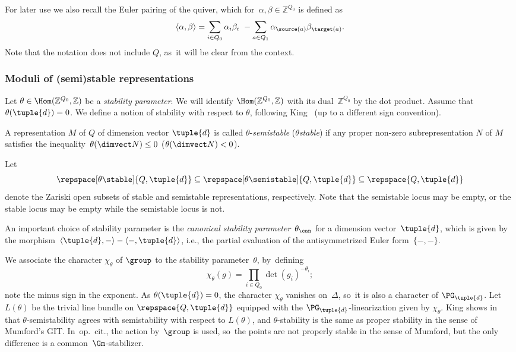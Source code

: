 For later use we also recall the Euler pairing of the quiver,
which for~$\alpha, \beta \in \mathbb{Z}^{Q_0}$
is defined as
\begin{equation*}
\langle \alpha, \beta \rangle = \sum_{i \in Q_0} \alpha_i \beta_i ~- \sum_{a \in Q_1} \alpha_{\source(a)} \beta_{\target(a)}.
\end{equation*}
Note that the notation does not include $Q$, as~it will be clear from the context.

\subsubsection*{Moduli of (semi)stable representations}
Let $\theta\in\Hom(\mathbb{Z}^{Q_0},\mathbb{Z})$ be a \emph{stability parameter}.
We will identify $\Hom(\mathbb{Z}^{Q_0},\mathbb{Z})$ with its dual~$\mathbb{Z}^{Q_0}$ by the dot product.
Assume that $\theta(\tuple{d}) = 0$.
We define a notion of stability with respect to $\theta$,
following King~\cite{MR1315461} (up to a different sign convention).
\begin{definition}
\label{definition:semistability}
A representation $M$ of $Q$ of dimension vector $\tuple{d}$
is called $\theta$\nobreakdash-\emph{semistable} (\resp $\theta$\dash\emph{stable})
if any proper non-zero subrepresentation $N$ of $M$
satisfies the inequality~$\theta(\dimvect N) \leq 0$ (\resp $\theta(\dimvect N) < 0$).
\end{definition}

Let
\begin{equation*}
\repspace[\theta\stable]{Q,\tuple{d}}
\subseteq\repspace[\theta\semistable]{Q,\tuple{d}}
\subseteq\repspace{Q,\tuple{d}}
\end{equation*}
denote the Zariski open subsets of stable and semistable representations, respectively.
Note that the semistable locus may be empty,
or the stable locus may be empty while the semistable locus is not.

An important choice of stability parameter is
the \emph{canonical stability parameter}~$\theta_\can$ for a dimension vector~$\tuple{d}$,
which is given by the morphism~$\langle\tuple{d},-\rangle-\langle-,\tuple{d}\rangle$,
i.e.,
the partial evaluation of the antisymmetrized Euler form~$\{-,-\}$.

We associate the character $\chi_\theta$ of $\group$
to the stability parameter~$\theta$, by~defining
\begin{equation*}
\chi_\theta(g) = \prod_{i \in Q_0} \det(g_i)^{-\theta_i};
\end{equation*}
note the minus sign in the exponent.
As $\theta(\tuple{d}) = 0$,
the character $\chi_{\theta}$ vanishes on~$\Delta$, so~it is also a character of $\PG_{\tuple{d}}$.
Let $L(\theta)$ be the trivial line bundle on $\repspace{Q,\tuple{d}}$
equipped with the $\PG_\tuple{d}$-linearization given by $\chi_\theta$.
King shows in~\cite[Th.\,4.1]{MR1315461} that $\theta$-semistability
agrees with semistability with respect to $L(\theta)$,
and $\theta$-stability is the same as proper stability in the sense of Mumford's GIT. In~op.~cit., the action by~$\group$ is used, so~the points are not properly stable in the sense of Mumford,
but the only difference is a common~$\Gm$-stabilizer.

